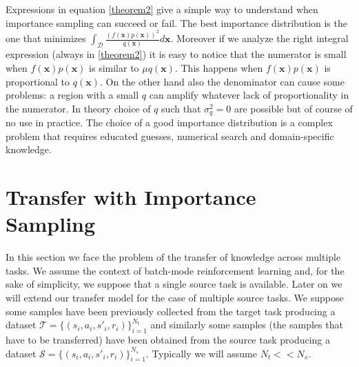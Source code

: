   \noindent Expressions in equation \ref{theorem2} give a simple way to understand when importance sampling can succeed or fail.
  The best importance distribution is the one that minimizes $\int_{\mathcal{D}} \frac{(f(\pmb{x}) p(\pmb{x}))^2}{q(\pmb{x})} d\pmb{x}$.
  Moreover if we analyze the right integral expression (always in \ref{theorem2}) it is easy to notice that the numerator is small
  when $f(\pmb{x})p(\pmb{x})$ is similar to $\mu q(\pmb{x})$. This happens when $f(\pmb{x})p(\pmb{x})$ is proportional to $q(\pmb{x})$.
  On the other hand also the denominator can cause some problems: a region with a small $q$ can amplify whatever lack of proportionality
  in the numerator.\newline
  In theory choice of $q$ such that $\sigma^{2}_{q} = 0$ are possible but of course of no use in practice. The choice
  of a good importance distribution is a complex problem that requires educated guesses, numerical search and domain-specific knowledge.


\section{Transfer with Importance Sampling}

\noindent In this section we face the problem of the transfer of knowledge across multiple tasks. We assume the context of
batch-mode reinforcement learning and, for the sake of simplicity, we suppose that a single source task is available. Later on
we will extend our transfer model for the case of multiple source tasks.\newline
We suppose some samples have been previously collected from the target task producing a dataset $\mathcal{T} = \{(s_{i},a_{i},s'_{i},r_{i})\}_{i=1}^{N_t} $ and
similarly some samples (the samples that have to be transferred) have been obtained from the source task producing a dataset $\mathcal{S} = \{(s_{i},a_{i},s'_{i},r_{i}) \}_{i=1}^{N_s}$.
Typically we will assume $N_t << N_s$.\newline

